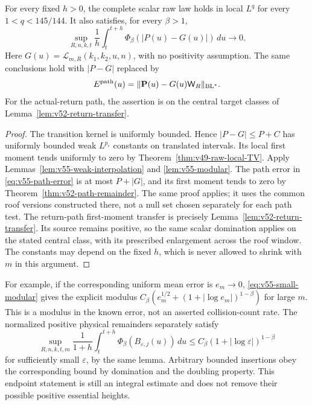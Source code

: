 \begin{theorem}
\label{thm:v55-raw-endpoint}
For every fixed $h>0$, the complete scalar raw law holds in local
$L^q$ for every $1<q<145/144$. It also satisfies, for every $\beta>1$,
\begin{equation}\label{eq:v55-raw-modular}
 \sup_{R,n,k,t}\frac1h\int_t^{t+h}
              \Phi_\beta(|P(u)-G(u)|)\,du\longrightarrow0.
\end{equation}
Here $G(u)=\mathcal L_{m,R}(k_1,k_2,u,n)$, with no positivity
assumption. The same conclusions hold with $|P-G|$ replaced by
\begin{equation}\label{eq:v55-path-error}
 E^{\rm path}(u)=
 \|\mathbf P(u)-G(u)\mathsf W_R\|_{\mathrm{BL}^*}.
\end{equation}
For the actual-return path, the assertion is on the central target
classes of Lemma~\ref{lem:v52-return-transfer}.
\end{theorem}
\begin{proof}
The transition kernel is uniformly bounded. Hence
$|P-G|\le P+C$ has uniformly bounded weak $L^{p_c}$ constants on
translated intervals. Its local first moment tends uniformly to zero
by Theorem~\ref{thm:v49-raw-local-TV}. Apply
Lemmas~\ref{lem:v55-weak-interpolation} and \ref{lem:v55-modular}.
The path error in \eqref{eq:v55-path-error} is at most $P+|G|$,
and its first moment tends to zero by
Theorem~\ref{thm:v52-path-remainder}. The same proof applies; it
uses the common roof versions constructed there, not a null set chosen
separately for each path test. The return-path first-moment transfer
is precisely Lemma~\ref{lem:v52-return-transfer}. Its source remains
positive, so the same scalar domination applies on the stated central
class, with its prescribed enlargement across the roof window.
The constants may depend on the fixed $h$, which is never allowed to
shrink with $m$ in this argument.
\end{proof}

For example, if the corresponding uniform mean error is $e_m\to0$,
\eqref{eq:v55-small-modular} gives the explicit modulus
$C_\beta(e_m^{1/2}+(1+|\log e_m|)^{1-\beta})$ for large $m$.
This is a modulus in the known error, not an asserted collision-count
rate. The normalized positive physical remainders separately satisfy
\[
 \sup_{R,n,k,t,m}\frac1{1+h}\int_t^{t+h}
       \Phi_\beta(B_{\varepsilon,j}(u))\,du
       \le C_\beta(1+|\log\varepsilon|)^{1-\beta}
\]
for sufficiently small $\varepsilon$, by the same lemma. Arbitrary
bounded insertions obey the corresponding bound by domination and
the doubling property. This endpoint statement is still an integral
estimate and does not remove their possible positive essential heights.


